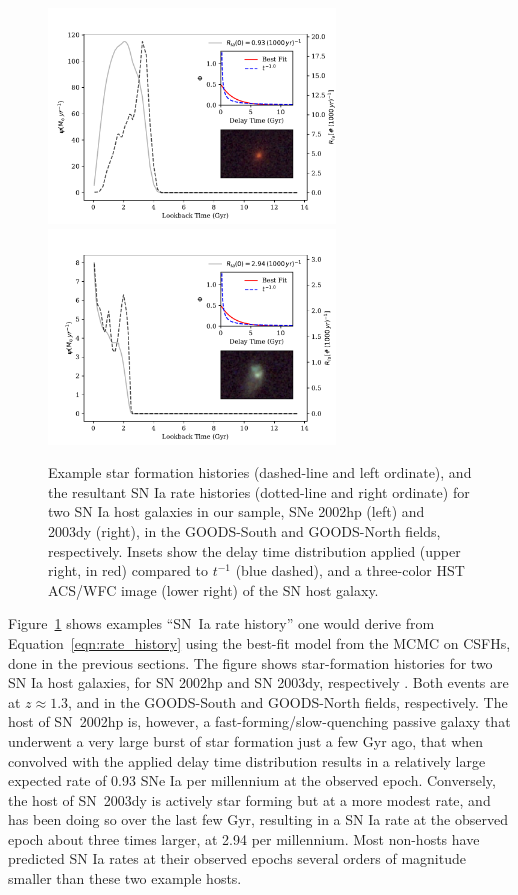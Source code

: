 \documentclass[apj]{aastex62}
\begin{document}
\begin{figure}[t] %
   \centering
   \includegraphics[width=3in]{figure_sfh_demo_v1} 
   \includegraphics[width=3in]{figure_sfh_demo_v2} 
   \caption{\footnotesize Example star formation histories (dashed-line and left ordinate), and the resultant SN Ia rate histories (dotted-line and right ordinate) for two SN Ia host galaxies in our sample, SNe 2002hp (left) and 2003dy (right), in the GOODS-South and GOODS-North fields, respectively. Insets show the delay time distribution applied (upper right, in red) compared to $t^{-1}$ (blue dashed), and a three-color HST ACS/WFC image (lower right) of the SN host galaxy.}
   \label{fig:figure_sfh_fit_demo}
\end{figure}

Figure~\ref{fig:figure_sfh_fit_demo} shows examples ``SN~Ia rate history'' one would derive from Equation~\ref{eqn:rate_history} using the best-fit model from the MCMC on CSFHs, done in the previous sections. The figure shows star-formation histories for two SN Ia host galaxies, for SN 2002hp and SN 2003dy, respectively \cite[see][ for further details on these events]{Strolger:2004}. Both events are at $z\approx 1.3$, and in the GOODS-South and GOODS-North fields, respectively. The host of SN~2002hp is, however, a fast-forming/slow-quenching passive galaxy that underwent a very large burst of star formation just a few Gyr ago, that when convolved with the applied delay time distribution results in a relatively large expected rate of 0.93 SNe Ia per millennium at the observed epoch.  Conversely, the host of SN~2003dy is actively star forming but at a more modest rate, and has been doing so over the last few Gyr, resulting in a SN Ia rate at the observed epoch about three times larger, at 2.94 per millennium. Most non-hosts have predicted SN Ia rates at their observed epochs several orders of magnitude smaller than these two example hosts. 
  
\end{document}
